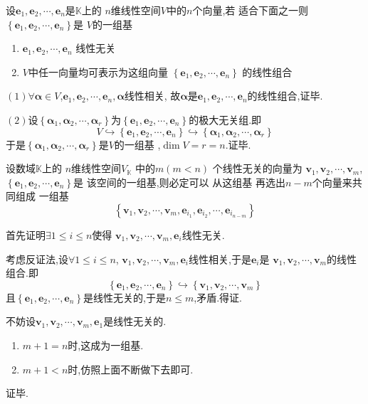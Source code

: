 \begin{formal}
\begin{theorem}[基的判定定理]\label{thm:基的判定定理}
    设$\bm{e}_1,\bm{e}_2,\cdots,\bm{e}_n $是$\mathbb{K}$上的
    $n$维线性空间$V$中的$n$个向量,若
    适合下面之一则$\left\{
        \bm{e}_1,\bm{e}_2,\cdots,\bm{e}_n
    \right\}$是
    $V$的一组基
    \begin{enumerate}[label=\textup{(\arabic*)}]
       \item $\bm{e}_1,\bm{e}_2,\cdots,\bm{e}_n$
        线性无关
       \item $V$中任一向量均可表示为这组向量
       $\left\{
        \bm{e}_1,\bm{e}_2,\cdots,\bm{e}_n
    \right\}$
       的线性组合
    \end{enumerate}   
\end{theorem}
\begin{Proof}
$(1)$$\forall \bm{\alpha}\in V$,$\bm{e}_1,\bm{e}_2,\cdots,\bm{e}_n,\bm{\alpha}$线性相关,
故$\bm{\alpha}$是$\bm{e}_1,\bm{e}_2,\cdots,\bm{e}_n$的线性组合,证毕.

$(2)$设$\left\{\bm{\alpha}_1,\bm{\alpha}_2,\cdots
,\bm{\alpha}_r\right\}$为$\left\{
    \bm{e}_1,\bm{e}_2,\cdots,\bm{e}_n
\right\}$的极大无关组.即
\[
V\hookrightarrow \left\{\bm{e}_1,\bm{e}_2,\cdots
,\bm{e}_n\right\}\hookrightarrow
\left\{\bm{\alpha}_1,\bm{\alpha}_2,\cdots
,\bm{\alpha}_r\right\}
\]
于是$\left\{\bm{\alpha}_1,\bm{\alpha}_2,\cdots
,\bm{\alpha}_r\right\}$是$V$的一组基
,$\dim V=r=n$.证毕.
\end{Proof}
\end{formal}
\begin{formal}
\begin{theorem}[基扩张定理]\label{thm:基扩张定理}
    设数域$\mathbb{K}$上的
    $n$维线性空间$V_{\mathbb{K}}$
    中的$m\left(m < n\right)$
    个线性无关的向量为
    $\bm{v}_1,\bm{v}_2
    ,\cdots,\bm{v}_m$,$\left\{
        \bm{e}_1,\bm{e}_2,\cdots
        ,\bm{e}_n
    \right\}$是
    该空间的一组基,则必定可以
    从这组基
    再选出$n - m$个向量来共同组成
    一组基
    \[
    \left\{\bm{v}_1,\bm{v}_2,
    \cdots,
    \bm{v}_m,\bm{e}_{i_1},\bm{e}_{i_2},
    \cdots,\bm{e}_{i_{n - m}}\right\}
    \]
\end{theorem}
\begin{Proof}
首先证明$\exists 1\leqslant i \leqslant n $使得
$\bm{v}_1,\bm{v}_2,\cdots,
\bm{v}_m,\bm{e}_i$线性无关.

考虑反证法,设$\forall 1
\leqslant i \leqslant n $,
$\bm{v}_1,\bm{v}_2,\cdots,
\bm{v}_m,\bm{e}_i$线性相关,于是$\bm{e}_i$是
$\bm{v}_1,\bm{v}_2,\cdots,
\bm{v}_m$的线性组合.即
\[
\left\{\bm{e}_1,\bm{e}_2,\cdots,\bm{e}_n\right\}
\hookrightarrow \left\{
    \bm{v}_1,\bm{v}_2,\cdots,\bm{v}_m
\right\}
\]
且$\left\{\bm{e}_1,\bm{e}_2,\cdots,\bm{e}_n\right\}
$是线性无关的,于是$n \leqslant m$,矛盾.得证.

不妨设$\bm{v}_1,\bm{v}_2,\cdots,\bm{v}_m,\bm{e}_1$是线性无关的.
\begin{enumerate}[label=\textup{(\arabic*)}]
\item $m+1=n$时,这成为一组基.

\item $m+1<n$时,仿照上面不断做下去即可.
\end{enumerate}
证毕.
\end{Proof}
\end{formal}
